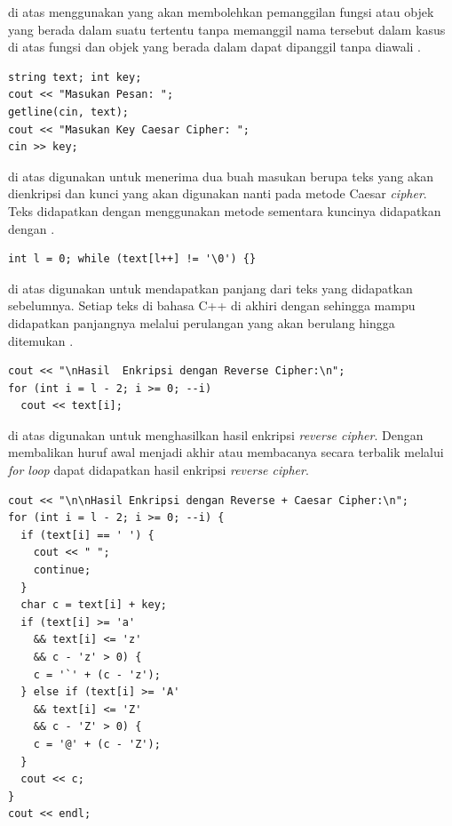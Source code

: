 \documentclass{subfiles}
\begin{document}
{\Script} di atas menggunakan {\statement}  yang akan membolehkan pemanggilan fungsi atau objek yang berada dalam suatu  tertentu tanpa memanggil nama  tersebut dalam kasus di atas fungsi dan objek yang berada dalam  dapat dipanggil tanpa diawali .

\begin{code}
\begin{verbatim}
string text; int key;
cout << "Masukan Pesan: ";
getline(cin, text);
cout << "Masukan Key Caesar Cipher: ";
cin >> key;
\end{verbatim}
\end{code}

{\Script} di atas digunakan untuk menerima dua buah masukan berupa teks yang akan dienkripsi dan kunci yang akan digunakan nanti pada metode Caesar \textit{cipher}. Teks didapatkan dengan menggunakan metode  sementara kuncinya didapatkan dengan .

\begin{code}
\begin{verbatim}
int l = 0; while (text[l++] != '\0') {}
\end{verbatim}
\end{code}

{\Script} di atas digunakan untuk mendapatkan panjang dari teks yang didapatkan sebelumnya. Setiap teks di bahasa C++ di akhiri dengan  sehingga  mampu didapatkan panjangnya melalui perulangan yang akan berulang hingga ditemukan .

\begin{code}
\begin{verbatim}
cout << "\nHasil  Enkripsi dengan Reverse Cipher:\n";
for (int i = l - 2; i >= 0; --i)
  cout << text[i];
\end{verbatim}
\end{code}

{\Script} di atas digunakan untuk menghasilkan hasil enkripsi \textit{reverse cipher}. Dengan membalikan huruf awal menjadi akhir atau membacanya secara terbalik melalui \textit{for loop} dapat didapatkan hasil enkripsi \textit{reverse cipher}.

\begin{code}
\begin{verbatim}
cout << "\n\nHasil Enkripsi dengan Reverse + Caesar Cipher:\n";
for (int i = l - 2; i >= 0; --i) {
  if (text[i] == ' ') {
    cout << " ";
    continue;
  }
  char c = text[i] + key;
  if (text[i] >= 'a'
    && text[i] <= 'z'
    && c - 'z' > 0) {
    c = '`' + (c - 'z');
  } else if (text[i] >= 'A'
    && text[i] <= 'Z'
    && c - 'Z' > 0) {
    c = '@' + (c - 'Z');
  }
  cout << c;
}
cout << endl;
\end{verbatim}
\end{code}
\end{document}
